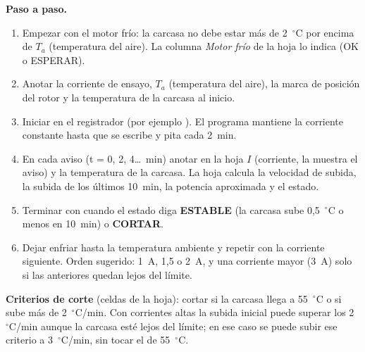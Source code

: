 \documentclass[11pt,a4paper]{article}
\newcommand{\code}[1]{\texttt{\detokenize{#1}}}
\begin{document}
\textbf{Paso a paso.}
\begin{enumerate}
\item Empezar con el motor frío: la carcasa no debe estar más de 2~$^\circ$C por encima de $T_a$ (temperatura del aire). La columna \emph{Motor frío} de la hoja lo indica (OK o ESPERAR).
\item Anotar la corriente de ensayo, $T_a$ (temperatura del aire), la marca de posición del rotor y la temperatura de la carcasa al inicio.
\item Iniciar \code{termico <A>} en el registrador (por ejemplo \code{termico 1}). El programa mantiene la corriente constante hasta que se escribe \code{s} y pita cada 2~min.
\item En cada aviso (t = 0, 2, 4\ldots~min) anotar en la hoja $I$ (corriente, la muestra el aviso) y la temperatura de la carcasa. La hoja calcula la velocidad de subida, la subida de los últimos 10~min, la potencia aproximada y el estado.
\item Terminar con \code{s} cuando el estado diga \textbf{ESTABLE} (la carcasa sube 0,5~$^\circ$C o menos en 10~min) o \textbf{CORTAR}.
\item Dejar enfriar hasta la temperatura ambiente y repetir con la corriente siguiente. Orden sugerido: 1~A, 1,5 o 2~A, y una corriente mayor (3~A) solo si las anteriores quedan lejos del límite.
\end{enumerate}

\textbf{Criterios de corte} (celdas de la hoja): cortar si la carcasa llega a 55~$^\circ$C o si sube más de 2~$^\circ$C/min. Con corrientes altas la subida inicial puede superar los 2~$^\circ$C/min aunque la carcasa esté lejos del límite; en ese caso se puede subir ese criterio a 3~$^\circ$C/min, sin tocar el de 55~$^\circ$C.
\end{document}
